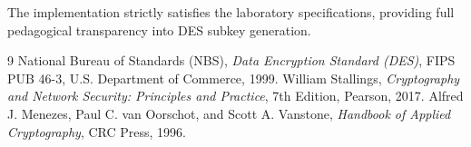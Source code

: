 \documentclass[12pt,a4paper]{article}
\begin{document}
The implementation strictly satisfies the laboratory specifications, providing full pedagogical transparency into DES subkey generation.

\begin{thebibliography}{9}
    National Bureau of Standards (NBS), \textit{Data Encryption Standard (DES)}, FIPS PUB 46-3, U.S. Department of Commerce, 1999.
    William Stallings, \textit{Cryptography and Network Security: Principles and Practice}, 7th Edition, Pearson, 2017.
    Alfred J. Menezes, Paul C. van Oorschot, and Scott A. Vanstone, \textit{Handbook of Applied Cryptography}, CRC Press, 1996.
\end{thebibliography}
\end{document}
